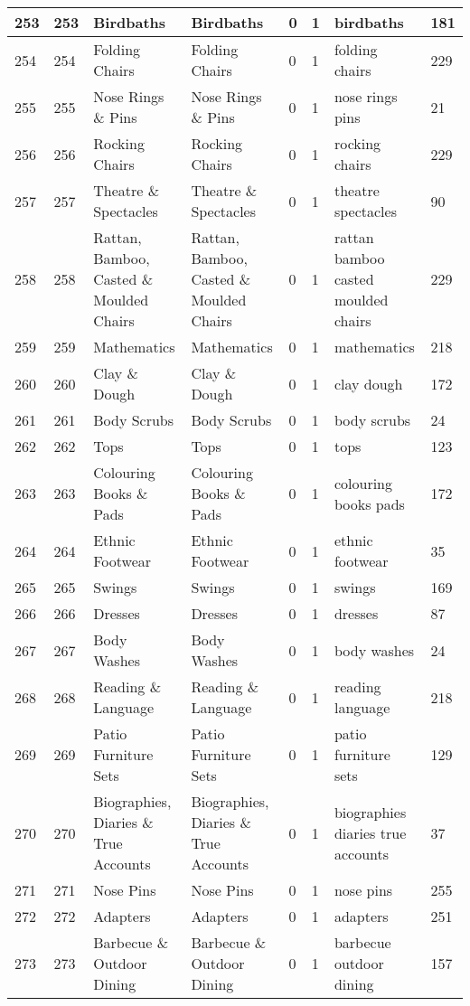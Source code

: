 \begin{longtable}{|l|l|l|l|l|l|l|l|}
253 & 253 & Birdbaths & Birdbaths & 0 & 1 & birdbaths & 181 \\ \hline 
254 & 254 & Folding Chairs & Folding Chairs & 0 & 1 & folding chairs & 229 \\ \hline 
255 & 255 & Nose Rings \& Pins & Nose Rings \& Pins & 0 & 1 & nose rings pins & 21 \\ \hline 
256 & 256 & Rocking Chairs & Rocking Chairs & 0 & 1 & rocking chairs & 229 \\ \hline 
257 & 257 & Theatre \& Spectacles & Theatre \& Spectacles & 0 & 1 & theatre spectacles & 90 \\ \hline 
258 & 258 & Rattan, Bamboo, Casted \& Moulded Chairs & Rattan, Bamboo, Casted \& Moulded Chairs & 0 & 1 & rattan bamboo casted moulded chairs & 229 \\ \hline 
259 & 259 & Mathematics & Mathematics & 0 & 1 & mathematics & 218 \\ \hline 
260 & 260 & Clay \& Dough & Clay \& Dough & 0 & 1 & clay dough & 172 \\ \hline 
261 & 261 & Body Scrubs & Body Scrubs & 0 & 1 & body scrubs & 24 \\ \hline 
262 & 262 & Tops & Tops & 0 & 1 & tops & 123 \\ \hline 
263 & 263 & Colouring Books \& Pads & Colouring Books \& Pads & 0 & 1 & colouring books pads & 172 \\ \hline 
264 & 264 & Ethnic Footwear & Ethnic Footwear & 0 & 1 & ethnic footwear & 35 \\ \hline 
265 & 265 & Swings & Swings & 0 & 1 & swings & 169 \\ \hline 
266 & 266 & Dresses & Dresses & 0 & 1 & dresses & 87 \\ \hline 
267 & 267 & Body Washes & Body Washes & 0 & 1 & body washes & 24 \\ \hline 
268 & 268 & Reading \& Language & Reading \& Language & 0 & 1 & reading language & 218 \\ \hline 
269 & 269 & Patio Furniture Sets & Patio Furniture Sets & 0 & 1 & patio furniture sets & 129 \\ \hline 
270 & 270 & Biographies, Diaries \& True Accounts & Biographies, Diaries \& True Accounts & 0 & 1 & biographies diaries true accounts & 37 \\ \hline 
271 & 271 & Nose Pins & Nose Pins & 0 & 1 & nose pins & 255 \\ \hline 
272 & 272 & Adapters & Adapters & 0 & 1 & adapters & 251 \\ \hline 
273 & 273 & Barbecue \& Outdoor Dining & Barbecue \& Outdoor Dining & 0 & 1 & barbecue outdoor dining & 157 \\ \hline 

\end{longtable}

